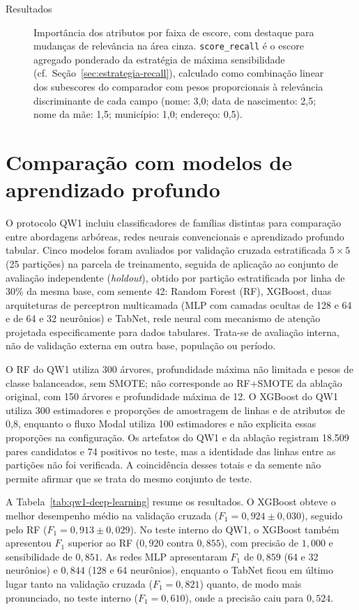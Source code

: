 \begin{chapter}{Resultados}
\begin{figure}[!ht]
\centering
\resizebox{0.92\textwidth}{!}{}
\caption{Importância dos atributos por faixa de escore, com destaque para mudanças de relevância na área cinza. \texttt{score\_recall} é o escore agregado ponderado da estratégia de máxima sensibilidade (cf.\ Seção~\ref{sec:estrategia-recall}), calculado como combinação linear dos subescores do comparador com pesos proporcionais à relevância discriminante de cada campo (nome: 3{,}0; data de nascimento: 2{,}5; nome da mãe: 1{,}5; município: 1{,}0; endereço: 0{,}5).}
\label{fig:feature-importance-heatmap}
\end{figure}

\section{Comparação com modelos de aprendizado profundo}
\label{sec:qw1-deep-learning}

O protocolo QW1 incluiu classificadores de famílias distintas para comparação entre abordagens arbóreas, redes neurais convencionais e aprendizado profundo tabular.
Cinco modelos foram avaliados por validação cruzada estratificada $5 \times 5$ (25 partições) na parcela de treinamento, seguida de aplicação ao conjunto de avaliação independente (\textit{holdout}), obtido por partição estratificada por linha de 30\% da mesma base, com semente 42: Random Forest (RF), XGBoost, duas arquiteturas de perceptron multicamada (MLP com camadas ocultas de 128 e 64 e de 64 e 32 neurônios) e TabNet, rede neural com mecanismo de atenção projetada especificamente para dados tabulares. Trata-se de avaliação interna, não de validação externa em outra base, população ou período.

O RF do QW1 utiliza 300 árvores, profundidade máxima não limitada e pesos de classe balanceados, sem SMOTE; não corresponde ao RF+SMOTE da ablação original, com 150 árvores e profundidade máxima de 12. O XGBoost do QW1 utiliza 300 estimadores e proporções de amostragem de linhas e de atributos de 0,8, enquanto o fluxo Modal utiliza 100 estimadores e não explicita essas proporções na configuração. Os artefatos do QW1 e da ablação registram 18.509 pares candidatos e 74 positivos no teste, mas a identidade das linhas entre as partições não foi verificada. A coincidência desses totais e da semente não permite afirmar que se trata do mesmo conjunto de teste.

A Tabela~\ref{tab:qw1-deep-learning} resume os resultados.
O XGBoost obteve o melhor desempenho médio na validação cruzada ($F_1 = 0{,}924 \pm 0{,}030$), seguido pelo RF ($F_1 = 0{,}913 \pm 0{,}029$).
No teste interno do QW1, o XGBoost também apresentou $F_1$ superior ao RF ($0{,}920$ contra $0{,}855$), com precisão de $1{,}000$ e sensibilidade de $0{,}851$.
As redes MLP apresentaram $F_1$ de $0{,}859$ (64 e 32 neurônios) e $0{,}844$ (128 e 64 neurônios), enquanto o TabNet ficou em último lugar tanto na validação cruzada ($F_1 = 0{,}821$) quanto, de modo mais pronunciado, no teste interno ($F_1 = 0{,}610$), onde a precisão caiu para $0{,}524$.


\end{chapter}

